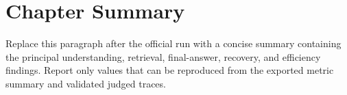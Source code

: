 \section{Chapter Summary}

Replace this paragraph after the official run with a concise summary containing
the principal understanding, retrieval, final-answer, recovery, and efficiency
findings. Report only values that can be reproduced from the exported metric
summary and validated judged traces.

